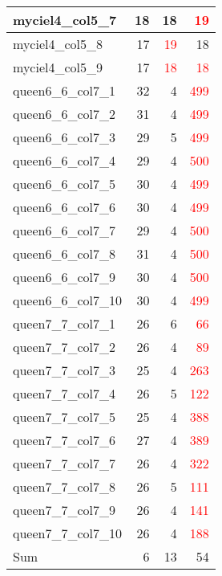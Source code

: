\begin{longtable}{l|rrr}
  myciel4\_col5\_7 & 18 & 18 & \textcolor{red}{19} \\ \hline
  myciel4\_col5\_8 & 17 & \textcolor{red}{19} & 18 \\ \hline
  myciel4\_col5\_9 & 17 & \textcolor{red}{18} & \textcolor{red}{18} \\ \hline
  queen6\_6\_col7\_1 & 32 & 4 & \textcolor{red}{499} \\ \hline
  queen6\_6\_col7\_2 & 31 & 4 & \textcolor{red}{499} \\ \hline
  queen6\_6\_col7\_3 & 29 & 5 & \textcolor{red}{499} \\ \hline
  queen6\_6\_col7\_4 & 29 & 4 & \textcolor{red}{500} \\ \hline
  queen6\_6\_col7\_5 & 30 & 4 & \textcolor{red}{499} \\ \hline
  queen6\_6\_col7\_6 & 30 & 4 & \textcolor{red}{499} \\ \hline
  queen6\_6\_col7\_7 & 29 & 4 & \textcolor{red}{500} \\ \hline
  queen6\_6\_col7\_8 & 31 & 4 & \textcolor{red}{500} \\ \hline
  queen6\_6\_col7\_9 & 30 & 4 & \textcolor{red}{500} \\ \hline
  queen6\_6\_col7\_10 & 30 & 4 & \textcolor{red}{499} \\ \hline
  queen7\_7\_col7\_1 & 26 & 6 & \textcolor{red}{66} \\ \hline
  queen7\_7\_col7\_2 & 26 & 4 & \textcolor{red}{89} \\ \hline
  queen7\_7\_col7\_3 & 25 & 4 & \textcolor{red}{263} \\ \hline
  queen7\_7\_col7\_4 & 26 & 5 & \textcolor{red}{122} \\ \hline
  queen7\_7\_col7\_5 & 25 & 4 & \textcolor{red}{388} \\ \hline
  queen7\_7\_col7\_6 & 27 & 4 & \textcolor{red}{389} \\ \hline
  queen7\_7\_col7\_7 & 26 & 4 & \textcolor{red}{322} \\ \hline
  queen7\_7\_col7\_8 & 26 & 5 & \textcolor{red}{111} \\ \hline
  queen7\_7\_col7\_9 & 26 & 4 & \textcolor{red}{141} \\ \hline
  queen7\_7\_col7\_10 & 26 & 4 & \textcolor{red}{188} \\ \hline \hline
  Sum & 6 & 13 & 54 \\ \hline
\end{longtable}